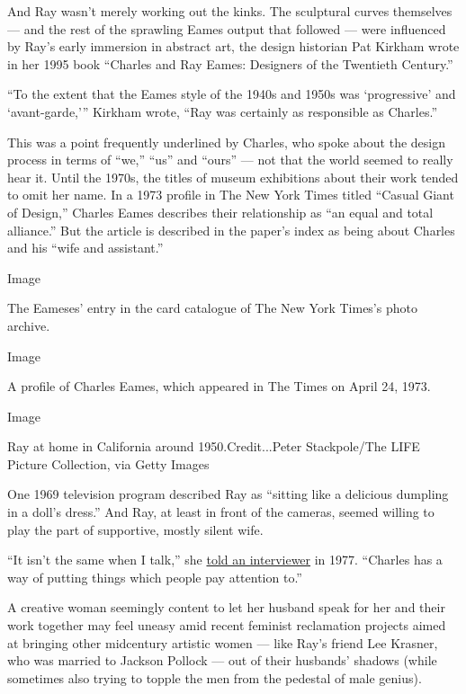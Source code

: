 And Ray wasn't merely working out the kinks. The sculptural curves
themselves --- and the rest of the sprawling Eames output that followed
--- were influenced by Ray's early immersion in abstract art, the design
historian Pat Kirkham wrote in her 1995 book ``Charles and Ray Eames:
Designers of the Twentieth Century.''

``To the extent that the Eames style of the 1940s and 1950s was
`progressive' and `avant-garde,''' Kirkham wrote, ``Ray was certainly as
responsible as Charles.''

This was a point frequently underlined by Charles, who spoke about the
design process in terms of ``we,'' ``us'' and ``ours'' --- not that the
world seemed to really hear it. Until the 1970s, the titles of museum
exhibitions about their work tended to omit her name. In a 1973 profile
in The New York Times titled ``Casual Giant of Design,'' Charles Eames
describes their relationship as ``an equal and total alliance.'' But the
article is described in the paper's index as being about Charles and his
``wife and assistant.''

Image

The Eameses' entry in the card catalogue of The New York Times's photo
archive.

Image

A profile of Charles Eames, which appeared in The Times on April 24,
1973.

Image

Ray at home in California around 1950.Credit...Peter Stackpole/The LIFE
Picture Collection, via Getty Images

One 1969 television program described Ray as ``sitting like a delicious
dumpling in a doll's dress.'' And Ray, at least in front of the cameras,
seemed willing to play the part of supportive, mostly silent wife.

``It isn't the same when I talk,'' she
\href{https://www.washingtonpost.com/archive/lifestyle/1977/07/24/the-eames-legend-of-spare-simplicity/dabc414e-583b-406d-8e45-a1fd3a9828d0/}{told
an interviewer} in 1977. ``Charles has a way of putting things which
people pay attention to.''

A creative woman seemingly content to let her husband speak for her and
their work together may feel uneasy amid recent feminist reclamation
projects aimed at bringing other midcentury artistic women --- like
Ray's friend Lee Krasner, who was married to Jackson Pollock --- out of
their husbands' shadows (while sometimes also trying to topple the men
from the pedestal of male genius).

